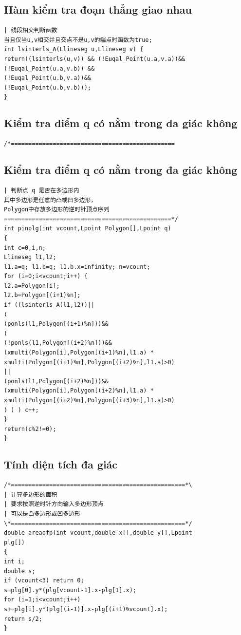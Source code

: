 \documentclass[11pt]{article}
\begin{document}
\subsection{Hàm kiểm tra đoạn thẳng giao nhau}

\begingroup
\scriptsize
\begin{verbatim}
| 线段相交判断函数
当且仅当u,v相交并且交点不是u,v的端点时函数为true;
int lsinterls_A(Llineseg u,Llineseg v) {
return((lsinterls(u,v)) && (!Euqal_Point(u.a,v.a))&&
(!Euqal_Point(u.a,v.b)) &&
(!Euqal_Point(u.b,v.a))&&
(!Euqal_Point(u.b,v.b)));
}
\end{verbatim}
\endgroup

\subsection{Kiểm tra điểm q có nằm trong đa giác không}

\begingroup
\scriptsize
\begin{verbatim}
/*===============================================
\end{verbatim}
\endgroup

\subsection{Kiểm tra điểm q có nằm trong đa giác không}

\begingroup
\scriptsize
\begin{verbatim}
| 判断点 q 是否在多边形内
其中多边形是任意的凸或凹多边形，
Polygon中存放多边形的逆时针顶点序列
================================================*/
int pinplg(int vcount,Lpoint Polygon[],Lpoint q)
{
int c=0,i,n;
Llineseg l1,l2;
l1.a=q; l1.b=q; l1.b.x=infinity; n=vcount;
for (i=0;i<vcount;i++) {
l2.a=Polygon[i];
l2.b=Polygon[(i+1)%n];
if ((lsinterls_A(l1,l2))||
(
(ponls(l1,Polygon[(i+1)%n]))&&
(
(!ponls(l1,Polygon[(i+2)%n]))&&
(xmulti(Polygon[i],Polygon[(i+1)%n],l1.a) *
xmulti(Polygon[(i+1)%n],Polygon[(i+2)%n],l1.a)>0)
||
(ponls(l1,Polygon[(i+2)%n]))&&
(xmulti(Polygon[i],Polygon[(i+2)%n],l1.a) *
xmulti(Polygon[(i+2)%n],Polygon[(i+3)%n],l1.a)>0)
) ) ) c++;
}
return(c%2!=0);
}
\end{verbatim}
\endgroup

\subsection{Tính diện tích đa giác}

\begingroup
\scriptsize
\begin{verbatim}
/*==================================================*\
| 计算多边形的面积
| 要求按照逆时针方向输入多边形顶点
| 可以是凸多边形或凹多边形
\*==================================================*/
double areaofp(int vcount,double x[],double y[],Lpoint
plg[])
{
int i;
double s;
if (vcount<3) return 0;
s=plg[0].y*(plg[vcount-1].x-plg[1].x);
for (i=1;i<vcount;i++)
s+=plg[i].y*(plg[(i-1)].x-plg[(i+1)%vcount].x);
return s/2;
}
\end{verbatim}
\endgroup
\end{document}
